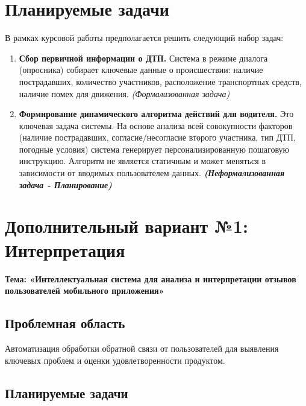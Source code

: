 \documentclass[12pt, a4paper]{article}
\begin{document}
\section*{Планируемые задачи}

В рамках курсовой работы предполагается решить следующий набор задач:

\begin{enumerate}
    \item \textbf{Сбор первичной информации о ДТП.}
    Система в режиме диалога (опросника) собирает ключевые данные о происшествии: наличие пострадавших, количество участников, расположение транспортных средств, наличие помех для движения.
    \textit{(Формализованная задача)}

    \item \textbf{Формирование динамического алгоритма действий для водителя.}
    Это ключевая задача системы. На основе анализа всей совокупности факторов (наличие пострадавших, согласие/несогласие второго участника, тип ДТП, погодные условия) система генерирует персонализированную пошаговую инструкцию. Алгоритм не является статичным и может меняться в зависимости от вводимых пользователем данных.
    \textit{\textbf{(Неформализованная задача - Планирование)}}

\end{enumerate}

\newpage
\section*{Дополнительный вариант №1: Интерпретация}

\textbf{Тема: «Интеллектуальная система для анализа и интерпретации отзывов пользователей мобильного приложения»}

\subsection*{Проблемная область}

Автоматизация обработки обратной связи от пользователей для выявления ключевых проблем и оценки удовлетворенности продуктом.

\subsection*{Планируемые задачи}
\end{document}
